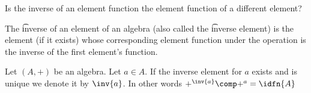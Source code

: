 

Is the inverse of an element function the element function of a different element?


The \t{inverse} of an element of an algebra (also called the \t{inverse element}) is the element (if it exists) whose corresponding element function under the operation is the inverse of the first element's function.


Let $(A, +)$ be an algebra.
Let $a \in A$.
If the inverse element for $a$ exists and is unique we denote it by $\inv{a}$.
In other words $+^{\inv{a}} \comp +^{a} = \idfn{A}$